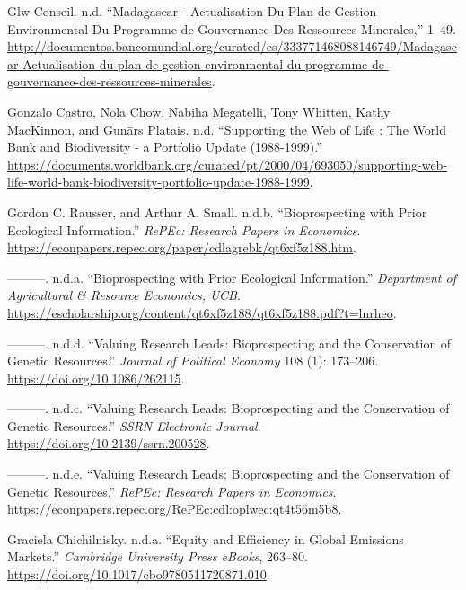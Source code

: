 \begin{CSLReferences}{1}{0}
Glw Conseil. n.d. {``Madagascar - Actualisation Du Plan de Gestion
Environmental Du Programme de Gouvernance Des Ressources Minerales,''}
1--49.
\url{http://documentos.bancomundial.org/curated/es/333771468088146749/Madagascar-Actualisation-du-plan-de-gestion-environmental-du-programme-de-gouvernance-des-ressources-minerales}.

Gonzalo Castro, Nola Chow, Nabiha Megatelli, Tony Whitten, Kathy
MacKinnon, and Gunārs Platais. n.d. {``Supporting the Web of Life : The
World Bank and Biodiversity - a Portfolio Update (1988-1999).''}
\url{https://documents.worldbank.org/curated/pt/2000/04/693050/supporting-web-life-world-bank-biodiversity-portfolio-update-1988-1999}.

Gordon C. Rausser, and Arthur A. Small. n.d.b. {``Bioprospecting with
Prior Ecological Information.''} \emph{RePEc: Research Papers in
Economics}.
\url{https://econpapers.repec.org/paper/cdlagrebk/qt6xf5z188.htm}.

---------. n.d.a. {``Bioprospecting with Prior Ecological
Information.''} \emph{Department of Agricultural \& Resource Economics,
UCB}.
\url{https://escholarship.org/content/qt6xf5z188/qt6xf5z188.pdf?t=lnrheo}.

---------. n.d.d. {``Valuing Research Leads: Bioprospecting and the
Conservation of Genetic Resources.''} \emph{Journal of Political
Economy} 108 (1): 173--206. \url{https://doi.org/10.1086/262115}.

---------. n.d.c. {``Valuing Research Leads: Bioprospecting and the
Conservation of Genetic Resources.''} \emph{SSRN Electronic Journal}.
\url{https://doi.org/10.2139/ssrn.200528}.

---------. n.d.e. {``Valuing Research Leads: Bioprospecting and the
Conservation of Genetic Resources.''} \emph{RePEc: Research Papers in
Economics}.
\url{https://econpapers.repec.org/RePEc:cdl:oplwec:qt4t56m5b8}.

Graciela Chichilnisky. n.d.a. {``Equity and Efficiency in Global
Emissions Markets.''} \emph{Cambridge University Press eBooks}, 263--80.
\url{https://doi.org/10.1017/cbo9780511720871.010}.


\end{CSLReferences}
